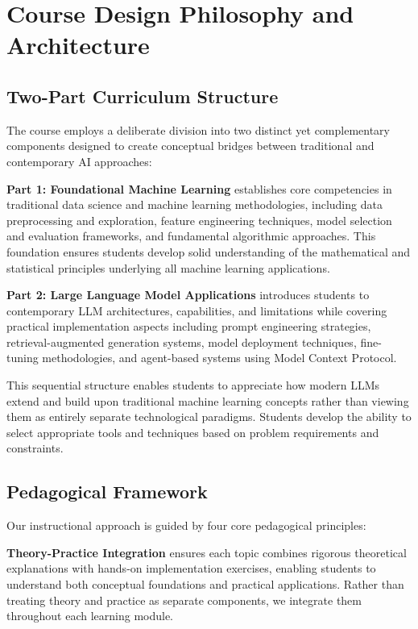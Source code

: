 \documentclass{article}
\begin{document}
\section{Course Design Philosophy and Architecture}

\subsection{Two-Part Curriculum Structure}

The course employs a deliberate division into two distinct yet complementary components designed to create conceptual bridges between traditional and contemporary AI approaches:

\textbf{Part 1: Foundational Machine Learning} establishes core competencies in traditional data science and machine learning methodologies, including data preprocessing and exploration, feature engineering techniques, model selection and evaluation frameworks, and fundamental algorithmic approaches. This foundation ensures students develop solid understanding of the mathematical and statistical principles underlying all machine learning applications.

\textbf{Part 2: Large Language Model Applications} introduces students to contemporary LLM architectures, capabilities, and limitations while covering practical implementation aspects including prompt engineering strategies, retrieval-augmented generation systems, model deployment techniques, fine-tuning methodologies, and agent-based systems using Model Context Protocol.

This sequential structure enables students to appreciate how modern LLMs extend and build upon traditional machine learning concepts rather than viewing them as entirely separate technological paradigms. Students develop the ability to select appropriate tools and techniques based on problem requirements and constraints.

\subsection{Pedagogical Framework}

Our instructional approach is guided by four core pedagogical principles:

\textbf{Theory-Practice Integration} ensures each topic combines rigorous theoretical explanations with hands-on implementation exercises, enabling students to understand both conceptual foundations and practical applications. Rather than treating theory and practice as separate components, we integrate them throughout each learning module.
\end{document}
